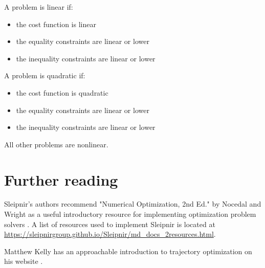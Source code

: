A problem is linear if:
\begin{itemize}
  \item the cost function is linear
  \item the equality constraints are linear or lower
  \item the inequality constraints are linear or lower
\end{itemize}

A problem is quadratic if:
\begin{itemize}
  \item the cost function is quadratic
  \item the equality constraints are linear or lower
  \item the inequality constraints are linear or lower
\end{itemize}

All other problems are nonlinear.

\section{Further reading}

Sleipnir's authors recommend "Numerical Optimization, 2nd Ed." by Nocedal and
Wright as a useful introductory resource for implementing optimization problem
solvers \cite{bib:numerical_optimization}. A list of resources used to implement
Sleipnir is located at
\url{https://sleipnirgroup.github.io/Sleipnir/md_docs_2resources.html}.

Matthew Kelly has an approachable introduction to trajectory optimization on his
website \cite{bib:intro_to_traj_opt}.

